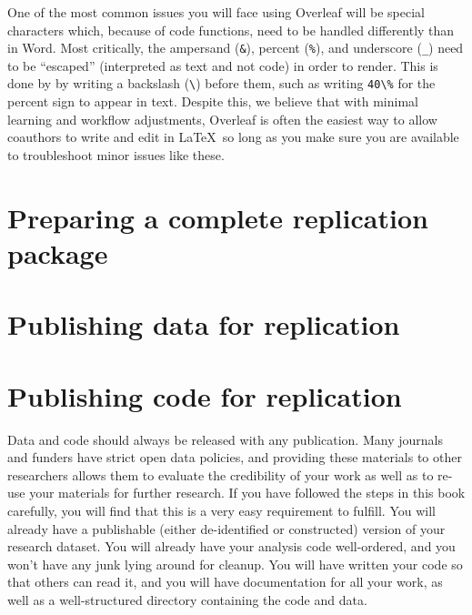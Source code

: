 One of the most common issues you will face using Overleaf will be special characters
which, because of code functions, need to be handled differently than in Word.
Most critically, the ampersand (\texttt{\&}), percent (\texttt{\%}), and underscore (\texttt{\_})
need to be ``escaped'' (interpreted as text and not code) in order to render.
This is done by by writing a backslash (\texttt{\textbackslash}) before them,
such as writing \texttt{40\textbackslash\%} for the percent sign to appear in text.
Despite this, we believe that with minimal learning and workflow adjustments,
Overleaf is often the easiest way to allow coauthors to write and edit in \LaTeX\,
so long as you make sure you are available to troubleshoot minor issues like these.










\section{Preparing a complete replication package}

\section{Publishing data for replication}

\section{Publishing code for replication}

Data and code should always be released with any publication.
Many journals and funders have strict open data policies,
and providing these materials to other researchers
allows them to evaluate the credibility of your work
as well as to re-use your materials for further research.
If you have followed the steps in this book carefully,
you will find that this is a very easy requirement to fulfill.
You will already have a publishable (either de-identified or constructed)
version of your research dataset.
You will already have your analysis code well-ordered,
and you won't have any junk lying around for cleanup.
You will have written your code so that others can read it,
and you will have documentation for all your work,
as well as a well-structured directory containing the code and data.

